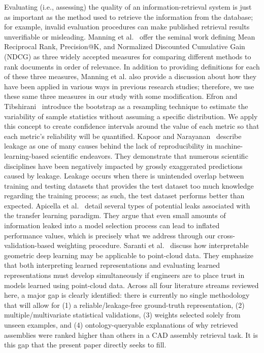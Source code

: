 \documentclass[preprint,12pt]{elsarticle}
\begin{document}
Evaluating (i.e., assessing) the quality of an information-retrieval system is just as important as the method used to retrieve the information from the database; for example, invalid evaluation procedures can make published retrieval results unverifiable or misleading.
Manning et al.~\cite{Manning2008} offer the seminal work defining Mean Reciprocal Rank, Precision@K, and Normalized Discounted Cumulative Gain (NDCG) as three widely accepted measures for comparing different methods to rank documents in order of relevance.
In addition to providing definitions for each of these three measures, Manning et al. also provide a discussion about how they have been applied in various ways in previous research studies; therefore, we use these same three measures in our study with some modification.
Efron and Tibshirani~\cite{Efron1993} introduce the bootstrap as a resampling technique to estimate the variability of sample statistics without assuming a specific distribution.
We apply this concept to create confidence intervals around the value of each metric so that each metric's reliability will be quantified.
Kapoor and Narayanan~\cite{Kapoor2023} describe leakage as one of many causes behind the lack of reproducibility in machine-learning-based scientific endeavors.
They demonstrate that numerous scientific disciplines have been negatively impacted by grossly exaggerated predictions caused by leakage.
Leakage occurs when there is unintended overlap between training and testing datasets that provides the test dataset too much knowledge regarding the training process; as such, the test dataset performs better than expected.
Apicella et al.~\cite{Apicella2025} detail several types of potential leaks associated with the transfer learning paradigm.
They argue that even small amounts of information leaked into a model selection process can lead to inflated performance values, which is precisely what we address through our cross-validation-based weighting procedure.
Saranti et al.~\cite{Saranti2024} discuss how interpretable geometric deep learning may be applicable to point-cloud data.
They emphasize that both interpreting learned representations and evaluating learned representations must develop simultaneously if engineers are to place trust in models learned using point-cloud data.
Across all four literature streams reviewed here, a major gap is clearly identified: there is currently no single methodology that will allow for (1) a reliable/leakage-free ground-truth representation, (2) multiple/multivariate statistical validations, (3) weights selected solely from unseen examples, and (4) ontology-queryable explanations of why retrieved assemblies were ranked higher than others in a CAD assembly retrieval task.
It is this gap that the present paper directly seeks to fill.
\end{document}

